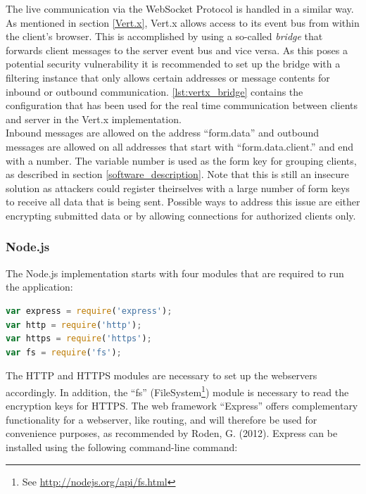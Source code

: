 The live communication via the WebSocket Protocol is handled in a similar way. As mentioned in section
\ref{Vert.x}, Vert.x allows access to its event bus from within the client's browser.
This is accomplished by using a so-called \textit{bridge} that forwards client messages to
the server event bus and vice versa. As this poses a potential security vulnerability
it is recommended to set up the bridge with a filtering instance that only allows certain
addresses or message contents for inbound or outbound communication. \autoref{lst:vertx_bridge} contains
the configuration that has been used for the real time communication between clients
and server in the Vert.x implementation.\\
Inbound messages are allowed on the address ``form.data'' and outbound messages
are allowed on all addresses that start with ``form.data.client.'' and end with a number.
The variable number is used as the form key for grouping clients, as described in section
\ref{software_description}. Note that this is still an insecure solution as attackers
could register theirselves with a large number of form keys to receive all data that
is being sent. Possible ways to address this issue are either encrypting submitted
data or by allowing connections for authorized clients only.




\subsubsection{Node.js}
\label{implementation_node}
The Node.js implementation starts with four modules that are required to run the application:

\begin{lstlisting}[language=javascript,caption={Including modules},label=lst:includenodemodules]
var express = require('express');
var http = require('http');
var https = require('https');
var fs = require('fs');
\end{lstlisting}

The HTTP and HTTPS modules are necessary to set up the webservers accordingly. 
In addition, the “fs” (FileSystem\footnote{See \url{ http://nodejs.org/api/fs.html}}) module is necessary to read the encryption keys for HTTPS. The web framework “Express” offers complementary functionality for a webserver, like routing, 
and will therefore be used for convenience purposes, as recommended by Roden, G. (2012). 
Express can be installed using the following command-line command:\\


